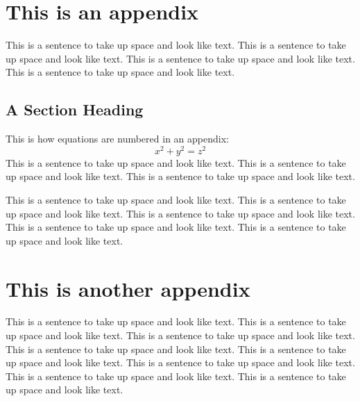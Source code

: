
\appendix    %

\chapter{This is an appendix}
This is a sentence to take up space and look like text.
This is a sentence to take up space and look like text.
This is a sentence to take up space and look like text.
This is a sentence to take up space and look like text.

\section{A Section Heading}

This is how equations are numbered in an appendix:
\begin{equation}
x^2 + y^2 = z^2
\end{equation}
This is a sentence to take up space and look like text.
This is a sentence to take up space and look like text.
This is a sentence to take up space and look like text.

This is a sentence to take up space and look like text.
This is a sentence to take up space and look like text.
This is a sentence to take up space and look like text.
This is a sentence to take up space and look like text.
This is a sentence to take up space and look like text.

\chapter{This is another appendix} 
This is a sentence to take up space and look like text.
This is a sentence to take up space and look like text.
This is a sentence to take up space and look like text.
This is a sentence to take up space and look like text.
This is a sentence to take up space and look like text.
This is a sentence to take up space and look like text.
This is a sentence to take up space and look like text.
This is a sentence to take up space and look like text.
